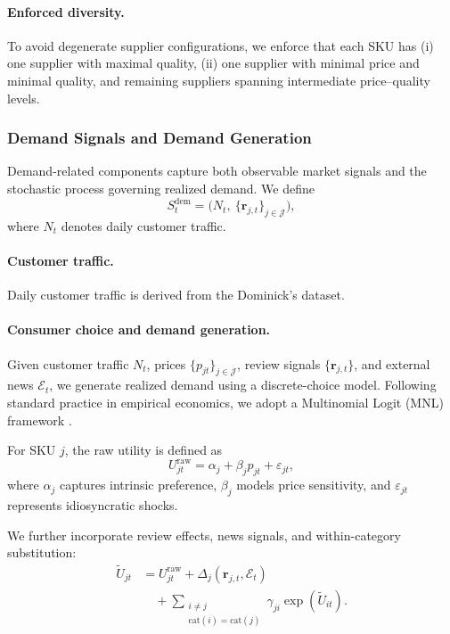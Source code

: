 \paragraph{Enforced diversity.}
To avoid degenerate supplier configurations, we enforce that each SKU has (i) one supplier with maximal quality, (ii) one supplier with minimal price and minimal quality, and remaining suppliers spanning intermediate price–quality levels.

\subsubsection{Demand Signals and Demand Generation}
\label{app:demand}

Demand-related components capture both observable market signals and the stochastic process governing realized demand. We define
\begin{equation}
S_t^{\text{dem}} =
\big(
N_t,\ \{\mathbf{r}_{j,t}\}_{j\in\mathcal{J}}
\big),
\end{equation}
where $N_t$ denotes daily customer traffic.

\paragraph{Customer traffic.}
Daily customer traffic is derived from the Dominick’s dataset.

\paragraph{Consumer choice and demand generation.}
Given customer traffic $N_t$, prices $\{p_{jt}\}_{j\in\mathcal{J}}$, review signals $\{\mathbf{r}_{j,t}\}$, and external news $\mathcal{E}_t$, we generate realized demand using a discrete-choice model. Following standard practice in empirical economics, we adopt a Multinomial Logit (MNL) framework \citep{mcfadden_conditional_1974, Uncles01041987}.

For SKU $j$, the raw utility is defined as
\begin{equation}
U_{jt}^{\mathrm{raw}} = \alpha_j + \beta_j p_{jt} + \varepsilon_{jt},
\end{equation}
where $\alpha_j$ captures intrinsic preference, $\beta_j$ models price sensitivity, and $\varepsilon_{jt}$ represents idiosyncratic shocks.

We further incorporate review effects, news signals, and within-category substitution:
\begin{equation}
\begin{aligned}
\tilde{U}_{jt}
&= U_{jt}^{\mathrm{raw}}
 + \Delta_j(\mathbf{r}_{j,t}, \mathcal{E}_t) \\
&\quad + \sum_{\substack{i \neq j \\ \mathrm{cat}(i)=\mathrm{cat}(j)}}
\gamma_{ji}\exp(\tilde{U}_{it}).
\end{aligned}
\end{equation}

